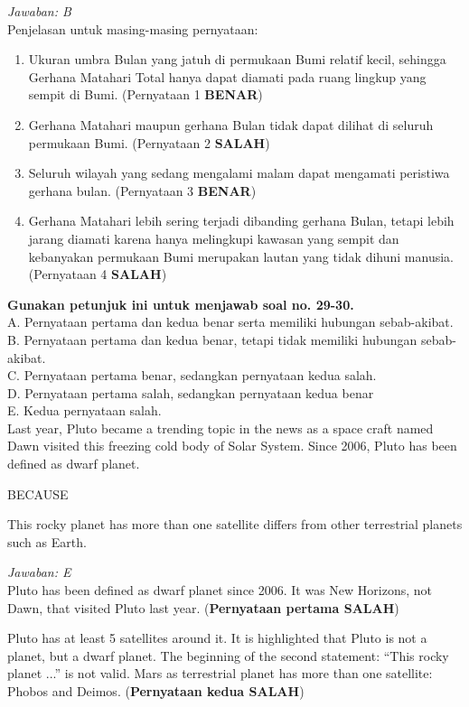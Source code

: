 \documentclass[11pt,fleqn, a4paper]{exam}
\begin{document}
\begin{questions}
\textit{Jawaban: B}\\
Penjelasan untuk masing-masing pernyataan:
\begin{enumerate}
\item Ukuran umbra Bulan yang jatuh di permukaan Bumi relatif kecil, sehingga Gerhana Matahari Total hanya dapat diamati pada ruang lingkup yang sempit di Bumi. (Pernyataan 1 \textbf{BENAR})
\item Gerhana Matahari maupun gerhana Bulan tidak dapat dilihat di seluruh permukaan Bumi. (Pernyataan 2 \textbf{SALAH})
\item Seluruh wilayah yang sedang mengalami malam dapat mengamati peristiwa gerhana bulan. (Pernyataan 3 \textbf{BENAR})
\item Gerhana Matahari lebih sering terjadi dibanding gerhana Bulan, tetapi lebih jarang diamati karena hanya melingkupi kawasan yang sempit dan kebanyakan permukaan Bumi merupakan lautan yang tidak dihuni manusia. (Pernyataan 4 \textbf{SALAH})
\end{enumerate}

\textbf{Gunakan petunjuk ini untuk menjawab soal no. 29-30.}\\
A. Pernyataan pertama dan kedua benar serta memiliki hubungan sebab-akibat.\\
B. Pernyataan pertama dan kedua benar, tetapi tidak memiliki hubungan sebab-akibat.\\
C. Pernyataan pertama benar, sedangkan pernyataan kedua salah.\\
D. Pernyataan pertama salah, sedangkan pernyataan kedua benar\\
E. Kedua pernyataan salah.\\

\question Last year, Pluto became a trending topic in the news as a space craft named Dawn visited this freezing cold body of Solar System. Since 2006, Pluto has been defined as dwarf planet.
\begin{center}
BECAUSE
\end{center}
\noindent This rocky planet has more than one satellite differs from other terrestrial planets such as Earth.

\textit{Jawaban: E}\\
Pluto has been defined as dwarf planet since 2006. It was New Horizons, not Dawn, that visited Pluto last year. (\textbf{Pernyataan pertama SALAH})


Pluto has at least 5 satellites around it. It is highlighted that Pluto is not a planet, but a dwarf planet. The beginning of the second statement: ``This rocky planet ...'' is not valid. Mars as terrestrial planet has more than one satellite: Phobos and Deimos. (\textbf{Pernyataan kedua SALAH})


\end{questions}
\end{document}
